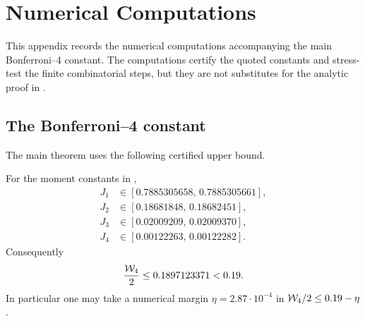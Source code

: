 \section{Numerical Computations}\label{app:numerical}

This appendix records the numerical computations accompanying the main
Bonferroni--4 constant.  The computations certify the quoted constants and
stress-test the finite combinatorial steps, but they are not substitutes for
the analytic proof in .

\subsection{The Bonferroni--4 constant}

The main theorem uses the following certified upper bound.

\begin{proposition}
\label{prop:wfour-certification}
For the moment constants in ,
\[
\begin{aligned}
  J_1&\in[0.7885305658,\,0.7885305661],\\
  J_2&\in[0.18681848,\,0.18682451],\\
  J_3&\in[0.02009209,\,0.02009370],\\
  J_4&\in[0.00122263,\,0.00122282].
\end{aligned}
\]
Consequently
\[
  \frac{\mathcal{W}_4}{2}\le 0.1897123371<0.19.
\]
In particular one may take a numerical margin
$\eta=2.87\cdot10^{-4}$ in $\mathcal{W}_4/2\le0.19-\eta$.
\end{proposition}

